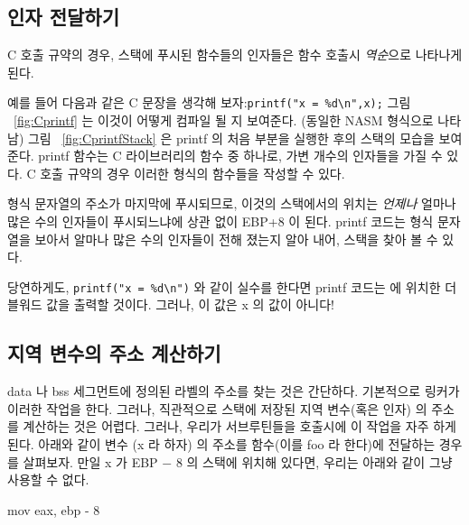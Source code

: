 
\subsection{인자 전달하기}

C 호출 규약의 경우, 스택에 푸시된 함수들의 인자들은 함수 호출시 \emph{역순}으로
나타나게 된다.

예를 들어 다음과 같은 C 문장을 생각해 보자:\verb|printf("x = %d\n",x);|
그림 ~\ref{fig:Cprintf} 는 이것이 어떻게 컴파일 될 지 보여준다. (동일한 NASM 형식으로 나타남)
그림 ~\ref{fig:CprintfStack} 은 {\code printf} 의 처음 부분을 실행한 후의 스택의
모습을 보여준다. {\code printf} 함수는 C 라이브러리의 함수 중 하나로, 가변 개수의
인자들을 가질 수 있다. C 호출 규약의 경우 이러한 형식의 함수들을 작성할 수 있다. 


형식 문자열의 주소가 마지막에 푸시되므로, 이것의 스택에서의 위치는 \emph{언제나} 얼마나
많은 수의 인자들이 푸시되느냐에 상관 없이 {\code EBP+8} 이 된다. {\code printf} 코드는 
형식 문자열을 보아서 알마나 많은 수의 인자들이 전해 졌는지 알아 내어, 스택을 찾아 볼 수 있다. 

당연하게도, \verb|printf("x = %d\n")| 와 같이 실수를 한다면 {\code printf} 코드는 {\code [EBP+12]}
에 위치한 더블워드 값을 출력할 것이다. 그러나, 이 값은 {\code x} 의 값이 아니다! 


\subsection{지역 변수의 주소 계산하기}

{\code data} 나 {\code bss} 세그먼트에 정의된 라벨의 주소를 찾는 것은 
간단하다. 기본적으로 링커가 이러한 작업을 한다. 그러나, 직관적으로 스택에
저장된 지역 변수(혹은 인자) 의 주소를 계산하는 것은 어렵다. 그러나, 우리가 
서브루틴들을 호출시에 이 작업을 자주 하게 된다. 아래와 같이 변수 ({\code x} 라 하자) 
의 주소를 함수(이를 {\code foo} 라 한다)에 전달하는 경우를 살펴보자. 
만일 {\code x} 가 EBP $-$ 8 의 스택에 위치해 있다면, 우리는 아래와 같이
그냥 사용할 수 없다. 

\begin{AsmCodeListing}[numbers=none,frame=none]
      mov    eax, ebp - 8
\end{AsmCodeListing}

